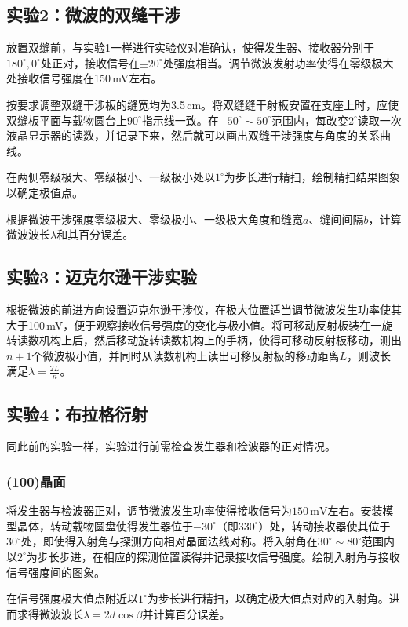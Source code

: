 \documentclass[UTF-8,twoside,cs4size]{ctexart}
\begin{document}
	\subsection{实验2：微波的双缝干涉}
	放置双缝前，与实验1一样进行实验仪对准确认，使得发生器、接收器分别于$ 180^\circ,0^\circ $处正对，接收信号在$ \pm20^\circ $处强度相当。调节微波发射功率使得在零级极大处接收信号强度在150\,mV左右。
		
	按要求调整双缝干涉板的缝宽均为3.5\,cm。将双缝缝干射板安置在支座上时，应使双缝板平面与载物圆台上$ 90^\circ $指示线一致。在$ -50^\circ\sim50^\circ $范围内，每改变$ 2^\circ $读取一次液晶显示器的读数，并记录下来，然后就可以画出双缝干涉强度与角度的关系曲线。
	
	在两侧零级极大、零级极小、一级极小处以$ 1^\circ $为步长进行精扫，绘制精扫结果图象以确定极值点。
	
	根据微波干涉强度零级极大、零级极小、一级极大角度和缝宽$a$、缝间间隔$ b $，计算微波波长$\lambda$和其百分误差。
	
	\subsection{实验3：迈克尔逊干涉实验}
	根据微波的前进方向设置迈克尔逊干涉仪，在极大位置适当调节微波发生功率使其大于100\,mV，便于观察接收信号强度的变化与极小值。将可移动反射板装在一旋转读数机构上后，然后移动旋转读数机构上的手柄，使得可移动反射板移动，测出$ n+1 $个微波极小值，并同时从读数机构上读出可移反射板的移动距离$ L $，则波长满足$ \lambda=\frac{2L}{n} $。
	
	\subsection{实验4：布拉格衍射}
	同此前的实验一样，实验进行前需检查发生器和检波器的正对情况。
	\subsubsection{(100)晶面}
	将发生器与检波器正对，调节微波发生功率使得接收信号为$ 150\,\mathrm{mV} $左右。安装模型晶体，转动载物圆盘使得发生器位于$ -30^\circ $（即$ 330^\circ $）处，转动接收器使其位于$ 30^\circ $处，即使得入射角与探测方向相对晶面法线对称。将入射角在$ 30^\circ\sim80^\circ $范围内以$ 2^\circ $为步长步进，在相应的探测位置读得并记录接收信号强度。绘制入射角与接收信号强度间的图象。
	
	在信号强度极大值点附近以$ 1^\circ $为步长进行精扫，以确定极大值点对应的入射角。进而求得微波波长$ \lambda=2d\cos\beta $并计算百分误差。
	
\end{document}
